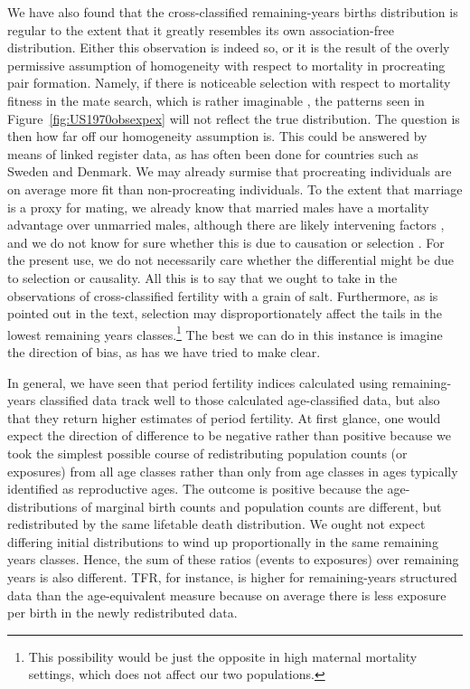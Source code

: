 We have also found that the cross-classified remaining-years births distribution
is regular to the extent that it greatly resembles its own association-free
distribution. Either this observation is indeed so, or it is the result of the
overly permissive assumption of homogeneity with respect to mortality in
procreating pair formation. Namely, if there is noticeable selection with
respect to mortality fitness in the mate search, which is rather imaginable
\citep{gangestad1993pathogen, roberts2008good}, the patterns seen in
Figure~\ref{fig:US1970obsexpex} will not reflect the true distribution. The
question is then how far off our homogeneity assumption is. This could be
answered by means of linked register data, as has often been done for countries
such as Sweden and Denmark. We may already surmise that procreating individuals
are on average more fit than non-procreating individuals. To the extent that
marriage is a proxy for mating, we already know that married males have a
mortality advantage over unmarried males, although
there are likely intervening factors \citep[see
e.g.,][]{rogers1995marriage, waite1995does}, and we do not know for sure whether
this is due to causation or selection \citep[see e.g.,][]{goldman1993marriage}.
For the present use, we do not necessarily care whether the differential might be due to
selection or causality. All this is to say that we ought to take in the
observations of cross-classified fertility with a grain of salt. Furthermore, as
is pointed out in the text, selection may disproportionately affect the tails 
in the lowest remaining years classes.\footnote{This possibility would be just
the opposite in high maternal mortality settings, which does not affect
our two populations.} The best we can do in this instance is imagine the
direction of bias, as has we have tried to make clear.

In general, we have seen that period fertility indices calculated using
remaining-years classified data track well to those calculated age-classified
data, but also that they return higher estimates of period fertility. At
first glance, one would expect the direction of difference to be negative 
rather than positive because we took the simplest possible course of
redistributing population counts (or exposures) from all age classes rather than
only from age classes in ages typically identified as reproductive ages. The
outcome is positive because the age-distributions of marginal birth counts and
population counts are different, but redistributed by the same lifetable death
distribution. We ought not expect differing initial distributions to wind up
proportionally in the same remaining years classes. Hence, the sum of these
ratios (events to exposures) over remaining years is also different. TFR, for
instance, is higher for remaining-years structured data than the age-equivalent
measure because on average there is less exposure per birth in the newly
redistributed data.

